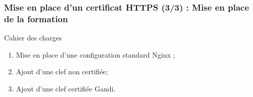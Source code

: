 \begin{frame}
	\frametitle{Mise en place d'un certificat HTTPS (3/3) : Mise en place de la formation}

	\begin{block}{Cahier des charges}
	 \begin{enumerate}
      \item Mise en place d'une configuration standard Nginx ;
	  \item Ajout d'une clef non certifiée;
	  \item Ajout d'une clef certifiée Gandi. 
	 \end{enumerate}
	\end{block}
\end{frame}

